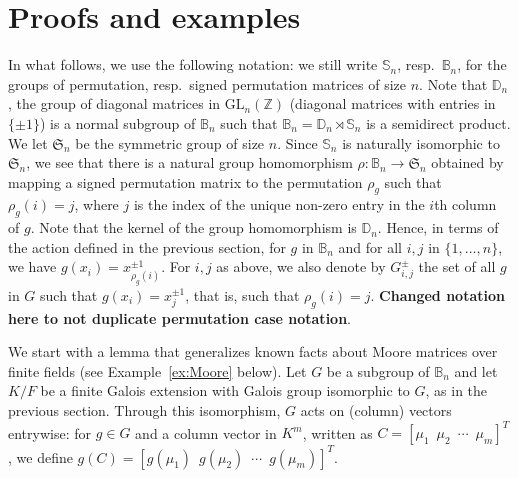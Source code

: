 \documentclass[12pt]{article}
\theoremstyle{plain}
\newcommand{\Z}{\ensuremath{\mathbb{Z}}}
\begin{document}

\section{Proofs and examples}


In what follows, we use the following notation: we still write
$\mathbb{S}_n$, resp.\ $\mathbb{B}_n$, for the groups of permutation,
resp.\ signed permutation matrices of size $n$. Note that $\mathbb{D}_n$, the group of  diagonal matrices 
in $\mathrm{GL}_n(\Z)$ (diagonal matrices with entries in $\{\pm 1\}$) is a normal subgroup of $\mathbb{B}_n$
such that $\mathbb{B}_n=\mathbb{D}_n\rtimes \mathbb{S}_n$ is a semidirect product.
We let $\mathfrak{S}_n$ be the symmetric group of size $n$.  Since $\mathbb{S}_n$ is naturally isomorphic to 
$\mathfrak{S}_n$, we see that there is a natural group homomorphism  
$\rho: \mathbb{B}_n \to \mathfrak{S}_n$ 
obtained by mapping a signed permutation matrix to the permutation
$\rho_g$ such that $\rho_g(i)=j$, where $j$ is the index of the
unique non-zero entry in the $i$th column of $g$.  Note that the kernel of the group homomorphism is $\mathbb{D}_n$. %
Hence, in terms of
the action defined in the previous section, for $g$ in $\mathbb{B}_n$
and for all $i,j$ in $\{1,\dots,n\}$, we have $g(x_i) =
x_{\rho_g(i)}^{\pm 1}$.  For $i,j$ as above, we also denote by
$G^{\pm}_{i,j}$ the set of all $g$ in $G$ such that $g(x_i)=x^{\pm 1}_j$, that is,
such that $\rho_g(i)=j$.
\textbf{Changed notation here to not duplicate permutation case notation}.

We start with a lemma that generalizes known facts about Moore
matrices over finite fields (see Example~\ref{ex:Moore} below). Let
$G$ be a subgroup of $\mathbb{B}_n$ and let $K/F$ be a finite Galois
extension with Galois group isomorphic to $G$, as in the previous
section. Through this isomorphism, $G$ acts on (column) vectors
entrywise: for $g \in G$ and a column vector in $K^m$, written as $C =
\left[\mu_{1} \,\,\, \mu_{2} \,\,\, \cdots \,\,\, \mu_{m}\right]^T$,
we define $g(C) = \left[g(\mu_{1}) \,\,\, g(\mu_{2}) \,\,\, \cdots
  \,\,\, g(\mu_{m})\right]^T$.
\end{document}
